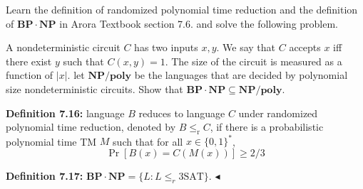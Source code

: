\documentclass[11pt]{article}
\newcommand{\NP}{\mathbf{NP}}
\newcommand{\1}{\mathbf{1}}
\newenvironment{problem}[2][Problem]{\begin{trivlist}
\item[\hskip \labelsep{\bfseries#1}\hskip\labelsep{\bfseries#2.}]}{\hfill$\blacktriangleleft$\end{trivlist}}
\begin{document}
\begin{problem}{4.(22 points)}
Learn the definition of randomized polynomial time reduction and the definition of $\mathbf{BP\cdot}\NP$ in Arora Textbook section 7.6. and solve the following problem.

A nondeterministic circuit $C$ has two inputs $x,y$. We say that $C$ accepts $x$ iff there exist $y$ such that $C(x,y) = 1$. The size of the circuit is measured as a function of $|x|$. let $\NP\textbf{/poly}$ be the languages that are decided by polynomial size nondeterministic circuits. Show that $\mathbf{BP\cdot}\NP \subseteq \NP\textbf{/poly}$.

\textbf{Definition 7.16:} language $B$ reduces to language $C$ under randomized polynomial time reduction, denoted by $B \le_{\text{r}} C$, if there is a probabilistic polynomial time TM $M$ such that for all $x \in \{0,1\}^*$, $$\Pr[B(x) = C(M(x))] \ge 2/3$$  

\textbf{Definition 7.17:} $\mathbf{BP\cdot}\NP = \{L: L \le_r \text{3SAT}\}$.
\end{problem}
\end{document}
